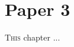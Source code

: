 \chapter{Paper 3}

\vspace*{-2.2em}
\minitoc
\vspace*{0.8em}

\lettrine[lines=3]{T}{his} chapter ...




